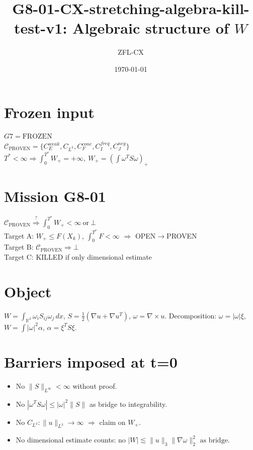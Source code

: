 \documentclass[11pt]{article}
\begin{document}
\title{G8-01-CX-stretching-algebra-kill-test-v1: Algebraic structure of $W$}
\author{ZFL-CX}\date{\today}\maketitle

\section{Frozen input}
\begin{center}
$\boxed{G7=\mathrm{FROZEN}}$\\
$\boxed{\mathcal C_{\mathrm{PROVEN}}=\{C_E^{weak},C_{L^3},C_F^{conc},C_I^{freq},C_J^{neg}\}}$\\
$\boxed{T^*<\infty\Rightarrow\int_0^{T^*}W_+=+\infty,\ W_+=\left(\int\omega^TS\omega\right)_+}$
\end{center}

\section{Mission G8-01}
\begin{center}
$\boxed{\mathcal C_{\mathrm{PROVEN}}\stackrel{?}{\Rightarrow}\int_0^{T^*}W_+<\infty\ \text{or}\ \bot}$\\
Target A: $W_+\le F(X_k)$, $\int_0^{T^*}F<\infty$ $\Rightarrow$ OPEN$\to$PROVEN\\
Target B: $\mathcal C_{\mathrm{PROVEN}}\Rightarrow\bot$\\
Target C: KILLED if only dimensional estimate
\end{center}

\section{Object}
$W=\int_{\mathbb R^3}\omega_i S_{ij}\omega_j\,dx$, $S=\tfrac12(\nabla u+\nabla u^T)$, $\omega=\nabla\times u$.
Decomposition: $\omega=|\omega|\xi$, $W=\int|\omega|^2\alpha$, $\alpha=\xi^TS\xi$.

\section{Barriers imposed at t=0}
\begin{itemize}
\item No $\|S\|_{L^\infty}<\infty$ without proof.
\item No $|\omega^TS\omega|\le|\omega|^2\|S\|$ as bridge to integrability.
\item No $C_{L^3}:\|u\|_{L^3}\to\infty$ $\Rightarrow$ claim on $W_+$.
\item No dimensional estimate counts: $\boxed{\text{no }|W|\lesssim\|u\|_3\|\nabla\omega\|_2^2\text{ as bridge}}$.
\end{itemize}
\end{document}
